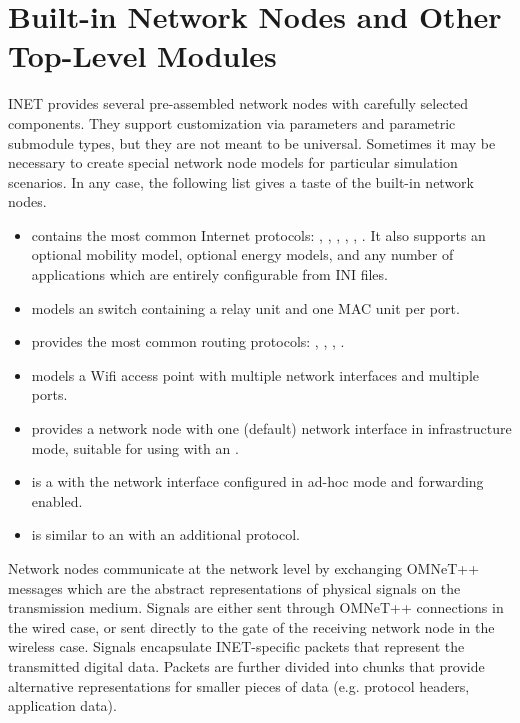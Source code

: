 \section{Built-in Network Nodes and Other Top-Level Modules}
\label{sec:networks:built-in-network-nodes-and-other-top-level-modules}

INET provides several pre-assembled network nodes with carefully selected
components. They support customization via parameters and parametric
submodule types, but they are not meant to be universal. Sometimes it may
be necessary to create special network node models for particular
simulation scenarios. In any case, the following list gives a taste of the
built-in network nodes.

\begin{itemize}
  \item {} contains the most common Internet protocols:
     , , , ,
     , . It also supports an
     optional mobility model, optional energy models, and any number of
     applications which are entirely configurable from INI files.
  \item {} models an  switch containing
     a relay unit and one MAC unit per port.
  \item {} provides the most common routing protocols:
     , , , .
  \item {} models a Wifi access point with multiple
      network interfaces and multiple 
     ports.
  \item {} provides a network node with one (default)
      network interface in infrastructure mode,
     suitable for using with an .
  \item {} is a  with the network
     interface configured in ad-hoc mode and forwarding enabled.
  \item {} is similar to an  with
     an additional  protocol.
\end{itemize}

Network nodes communicate at the network level by exchanging OMNeT++ messages
which are the abstract representations of physical signals on the
transmission medium.  Signals are either sent through OMNeT++ connections
in the wired case, or sent directly to the gate of the receiving network node
in the wireless case. Signals encapsulate INET-specific packets that represent
the transmitted digital data. Packets are further divided into chunks that
provide alternative representations for smaller pieces of data (e.g.
protocol headers, application data).

